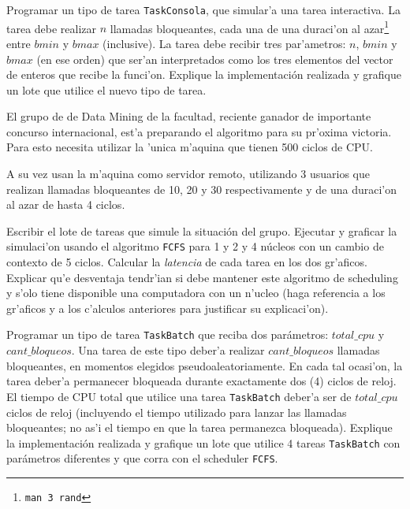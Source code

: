 \documentclass[a4paper,11pt]{article}
\begin{document}
\begin{ejercicio}

Programar un tipo de tarea \texttt{TaskConsola}, que simular'a una tarea
interactiva. La tarea debe realizar $n$ llamadas bloqueantes, cada una de una
duraci'on al azar\footnote{\texttt{man 3 rand}} entre $bmin$ y $bmax$
(inclusive). La tarea debe recibir tres par'ametros: $n$, $bmin$ y $bmax$ (en
ese orden) que ser'an interpretados como los tres elementos del vector de
enteros que recibe la funci'on. Explique la implementación realizada y
grafique un lote que utilice el nuevo tipo de tarea.

\end{ejercicio}

\begin{ejercicio}
El grupo de de Data Mining de la facultad, reciente ganador de importante concurso internacional, est'a preparando el algoritmo para su pr'oxima victoria. Para esto necesita utilizar la 'unica m'aquina que tienen 500 ciclos de CPU.

A su vez usan la m'aquina como servidor remoto, utilizando 3 usuarios que realizan llamadas bloqueantes de 10, 20 y 30 respectivamente y de una duraci'on al azar de hasta 4 ciclos.

Escribir el lote de tareas que simule la situación del grupo. Ejecutar y graficar la simulaci'on usando el algoritmo \texttt{FCFS} para 1 y 2 y 4 núcleos con un cambio de contexto de 5 ciclos. Calcular la \emph{latencia} de cada tarea en los dos gr'aficos. Explicar qu'e desventaja tendr'ian si debe mantener este algoritmo de scheduling y s'olo tiene disponible una computadora con un n'ucleo (haga referencia a los gr'aficos y a los c'alculos anteriores para justificar su explicaci'on).
\end{ejercicio}

\begin{ejercicio}

Programar un tipo de tarea \texttt{TaskBatch} que reciba dos parámetros:
$total\_cpu$ y $cant\_bloqueos$. Una tarea de este tipo deber'a realizar
$cant\_bloqueos$ llamadas bloqueantes, en momentos elegidos
pseudoaleatoriamente. En cada tal ocasi'on, la tarea deber'a permanecer
bloqueada durante exactamente dos (4) ciclos de reloj. El tiempo de CPU total
que utilice una tarea \texttt{TaskBatch} deber'a ser de $total\_cpu$ ciclos de
reloj (incluyendo el tiempo utilizado para lanzar las llamadas bloqueantes; no
as'i el tiempo en que la tarea permanezca bloqueada). Explique la
implementación realizada y grafique un lote que utilice 4 tareas \texttt{TaskBatch}
con parámetros diferentes y que corra con el scheduler \texttt{FCFS}.

\end{ejercicio}
\end{document}
